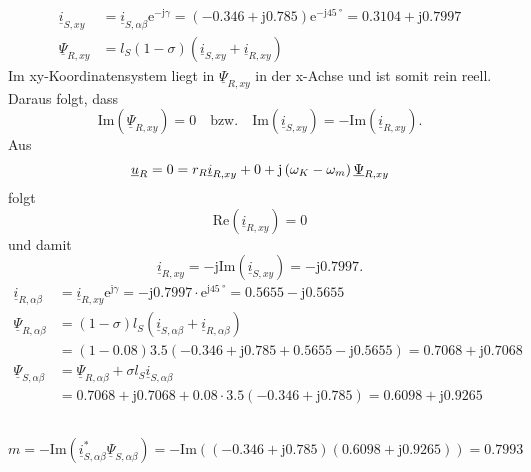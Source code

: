 \documentclass[11pt,a4paper]{scrartcl}
\newcommand{\mybr}[1]{\left(#1\right)}
\renewcommand{\j}{\mathrm{j}}
\renewcommand{\u}{\underline{u}}
\renewcommand{\i}{\underline{i}}
\newcommand{\PPsi}{\underline{\Psi}}
\newcommand{\0}{_{\mybr{0}}}
\newcommand{\1}{_{\mybr{1}}}
\newcommand{\2}{_{\mybr{2}}}
\renewcommand{\e}{\mathrm{e}}
\renewcommand{\Re}{\mathrm{Re}}
\renewcommand{\Im}{\mathrm{Im}}
\begin{document}
\subsection{}
\begin{align}
\i_{S,xy}&=\i_{S,\alpha\beta}\e^{-\j\gamma}=\mybr{\num{-0.346}+\j\num{0.785}}\e^{-\j\SI{45}{\degree}}=\num{0.3104}+\j\num{0.7997}\\
\PPsi_{R,xy}&=l_S\mybr{1-\sigma}\mybr{\i_{S,xy}+\i_{R,xy}}
\end{align}
Im xy-Koordinatensystem liegt in $\PPsi_{R,xy}$ in der x-Achse und ist somit rein reell. Daraus folgt, dass 
\begin{equation}
\Im\mybr{\PPsi_{R,xy}}=0\quad \text{bzw.}\quad \Im\mybr{\i_{S,xy}}=-\Im\mybr{\i_{R,xy}}.
\end{equation}
Aus
\begin{equation}
\u_R=0=r_R\i_{R,xy}+0+\j\mybr{\omega_K-\omega_m}\PPsi_{R,xy}\\
\end{equation}
folgt
\begin{equation}
\Re\mybr{\i_{R,xy}}=0
\end{equation}
und damit
\begin{equation}
\i_{R,xy}=-\j\Im\mybr{\i_{S,xy}}=-\j\num{0.7997}.
\end{equation}
\begin{align}
\i_{R,\alpha\beta}&=\i_{R,xy}\e^{\j\gamma}=-\j\num{0.7997}\cdot\e^{\j\SI{45}{\degree}}=\SI{0.5655}-\j\num{0.5655}\\
\PPsi_{R,\alpha\beta}&=\mybr{1-\sigma}l_S\mybr{\i_{S,\alpha\beta}+\i_{R,\alpha\beta}}\\
&=\mybr{1-\num{0.08}}\num{3.5}\mybr{\num{-0.346}+\j\num{0.785}+\SI{0.5655}-\j\num{0.5655}}=\num{0.7068}+\j\num{0.7068}\\
\PPsi_{S,\alpha\beta}&=\PPsi_{R,\alpha\beta}+\sigma l_S\i_{S,\alpha\beta}\\
&=\num{0.7068}+\j\num{0.7068}+\num{0.08}\cdot\num{3.5}\mybr{\num{-0.346}+\j\num{0.785}}=\num{0.6098}+\j\num{0.9265}
\end{align}

\subsection{}
\begin{equation}
m=-\Im\mybr{\i_{S,\alpha\beta}^*\PPsi_{S,\alpha\beta}}=-\Im\mybr{\mybr{\num{-0.346}+\j\num{0.785}}\mybr{\num{0.6098}+\j\num{0.9265}}}=\num{0.7993}
\end{equation}
\end{document}
